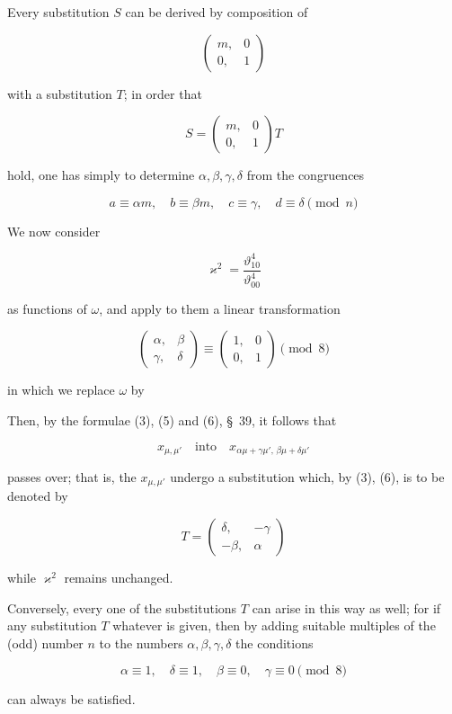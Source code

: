 Every substitution $S$ can be derived by composition of

\[
\begin{pmatrix} m, & 0 \\ 0, & 1 \end{pmatrix}
\]

with a substitution $T$; in order that

\[
S = \begin{pmatrix} m, & 0 \\ 0, & 1 \end{pmatrix} T
\]

hold, one has simply to determine $\alpha, \beta, \gamma, \delta$ from the congruences

\[
a \equiv \alpha m, \quad b \equiv \beta m, \quad c \equiv \gamma, \quad d \equiv \delta \pmod{n}
\]

We now consider


\[
\varkappa^2 = \frac{\vartheta_{10}^4}{\vartheta_{00}^4}
\]

as functions of $\omega$, and apply to them a linear transformation

\[
\begin{pmatrix} \alpha, & \beta \\ \gamma, & \delta \end{pmatrix} \equiv \begin{pmatrix} 1, & 0 \\ 0, & 1 \end{pmatrix} \pmod{8}
\]

in which we replace $\omega$ by


Then, by the formulae (3), (5) and (6), \S\, 39, it follows that

\[
x_{\mu,\mu'} \quad \text{into} \quad x_{\alpha\mu + \gamma\mu',\,\beta\mu + \delta\mu'}
\]

passes over; that is, the $x_{\mu,\mu'}$ undergo a substitution which, by (3), (6), is to be denoted by

\[
T = \begin{pmatrix} \delta, & -\gamma \\ -\beta, & \alpha \end{pmatrix}
\]

while $\varkappa^2$ remains unchanged.

Conversely, every one of the substitutions $T$ can arise in this way as well; for if any substitution $T$ whatever is given, then by adding suitable multiples of the (odd) number $n$ to the numbers $\alpha, \beta, \gamma, \delta$ the conditions

\[
\alpha \equiv 1, \quad \delta \equiv 1, \quad \beta \equiv 0, \quad \gamma \equiv 0 \pmod{8}
\]

can always be satisfied.
